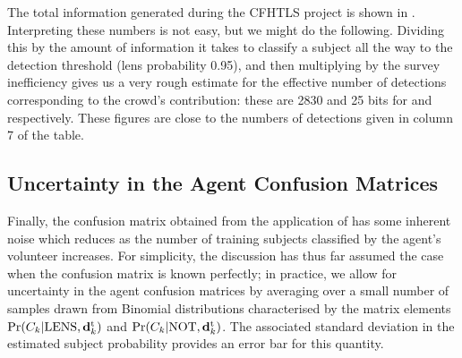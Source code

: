 \documentclass[useAMS,usenatbib,a4paper]{mn2e}
\begin{document}
The total information generated during the CFHTLS project is shown in
. Interpreting these numbers is not easy, but we
might do the following. Dividing this by the amount of information it takes to
classify a \SW subject all the way to the detection threshold (lens
probability 0.95), and then multiplying by the survey inefficiency gives us a
very rough estimate for the effective number of detections corresponding to
the crowd's contribution: these are 2830 and 25 bits for \StageOne and \StageTwo
respectively.  These figures are close to the numbers of detections given in
column 7 of the table.


\subsection{Uncertainty in the Agent Confusion Matrices}
\label{appendix:swap:uncertainty}

Finally, the confusion matrix obtained from the application of
 has some inherent noise which reduces as the
number of training subjects classified by the agent's volunteer
increases. For simplicity, the discussion has thus far assumed the case
when the confusion matrix is known perfectly; in practice, we allow for
uncertainty in the agent confusion matrices by averaging over a small
number of samples drawn from Binomial distributions characterised by the
matrix elements ${\rm Pr}(C_k|{\rm LENS},{\mathbf{d}^{\rm t}_k})$ and  ${\rm Pr}(C_k|{\rm NOT},{\mathbf{d}^{\rm t}_k})$. The
associated standard deviation in the estimated subject probability
provides an error bar for this quantity.

%
\end{document}
